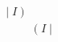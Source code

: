 \documentclass[preview]{standalone}
\begin{document}
\begin{align*}
\big| \; I \; ) \\ &(\;I \; \big| \;
\end{align*}
\end{document}
